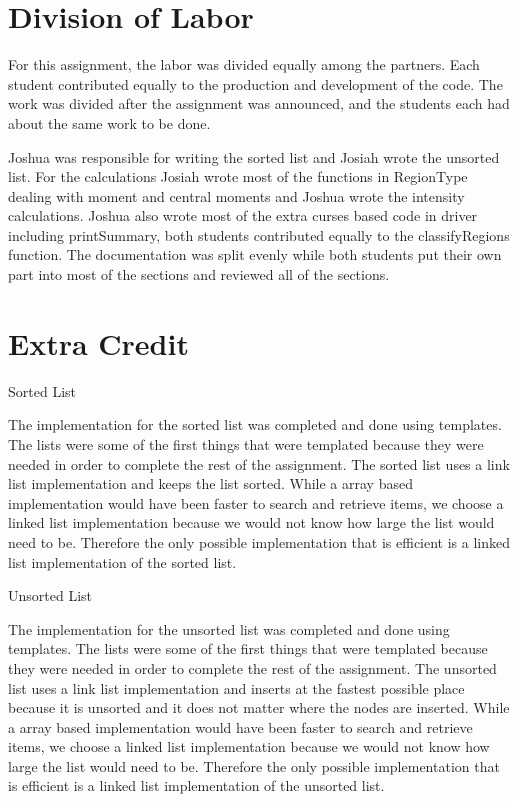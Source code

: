 \documentclass[pdftex, 11pt]{article}
\begin{document}
\section{Division of Labor}

For this assignment, the labor was divided equally among the partners. Each student contributed equally to the
production and development of the code. The work was divided after the assignment was announced, and the students each
had about the same work to be done.

Joshua was responsible for writing the sorted list and Josiah wrote the unsorted list.  For the calculations Josiah
wrote most of the functions in RegionType dealing with moment and central moments and Joshua wrote the intensity
calculations.  Joshua also wrote most of the extra curses based code in driver including printSummary, both students
contributed equally to the classifyRegions function.  The documentation was split evenly while both students put their
own part into most of the sections and reviewed all of the sections.

\section{Extra Credit}
\begin{description}
	\item{Sorted List}

		The implementation for the sorted list was completed and done using templates. The lists were some of the first
		things that were templated because they were needed in order to complete the rest of the assignment. The sorted
		list uses a link list implementation and keeps the list sorted. While a array based implementation would have
		been faster to search and retrieve items, we choose a linked list implementation because we would not know how
		large the list would need to be. Therefore the only possible implementation that is efficient is a linked list
		implementation of the sorted list.

	\item{Unsorted List}

		The implementation for the unsorted list was completed and done using templates. The lists were some of the
		first things that were templated because they were needed in order to complete the rest of the assignment. The
		unsorted list uses a link list implementation and inserts at the fastest possible place because it is unsorted
		and it does not matter where the nodes are inserted. While a array based implementation would have been faster
		to search and retrieve items, we choose a linked list implementation because we would not know how large the
		list would need to be. Therefore the only possible implementation that is efficient is a linked list
		implementation of the unsorted list.

\end{description}
\end{document}
